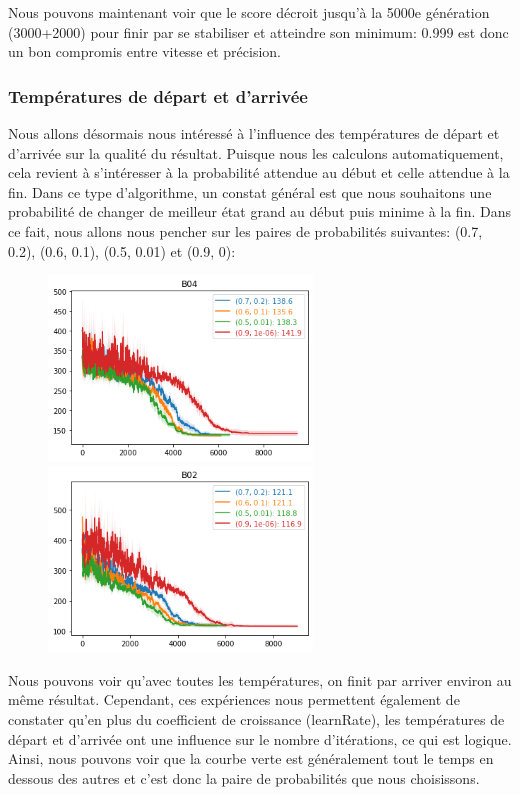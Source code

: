 \documentclass{article}
\begin{document}
Nous pouvons maintenant voir que le score décroit jusqu'à la 5000e génération (3000+2000) pour finir par se stabiliser et atteindre son minimum: 0.999 est donc un bon compromis entre vitesse et précision.

\subsubsection{Températures de départ et d'arrivée}
Nous allons désormais nous intéressé à l'influence des températures de départ et d'arrivée sur la qualité du résultat. Puisque nous les calculons automatiquement, cela revient à s'intéresser à la probabilité attendue au début et celle attendue à la fin. Dans ce type d'algorithme, un constat général est que nous souhaitons une probabilité de changer de meilleur état grand au début puis minime à la fin. Dans ce fait, nous allons nous pencher sur les paires de probabilités suivantes: (0.7, 0.2), (0.6, 0.1), (0.5, 0.01) et (0.9, 0):

\begin{figure}[H]
	\centerline{ \includegraphics[width=7cm]{images/B04temp.png} \includegraphics[width=7cm]{images/B02temp.png} } 
\end{figure}

Nous pouvons voir qu'avec toutes les températures, on finit par arriver environ au même résultat. Cependant, ces expériences nous permettent également de constater qu'en plus du coefficient de croissance (learnRate), les températures de départ et d'arrivée ont une influence sur le nombre d'itérations, ce qui est logique. Ainsi, nous pouvons voir que la courbe verte est généralement tout le temps en dessous des autres et c'est donc la paire de probabilités que nous choisissons.
\end{document}
